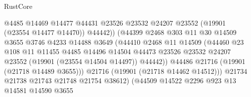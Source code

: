 \begin{lexlean}{RustCore}
\begin{coremodule}
                                      @4485
                                      @14469
                                      @14477
                                      @44431
                                      @23526
                                      @23532
                                      @24207
                                      @23552
                                      (@19901 (@23554 @14477 @14470))
                                      @44442))
                                  (@44399
                                    @2468
                                    @303
                                    @11
                                    @30
                                    @14509
                                    @3655
                                    @3746
                                    @4233
                                    @14488
                                    @3649
                                    (@44410
                                      @2468
                                      @11
                                      @14509
                                      (@44460
                                        @23
                                        @108
                                        @11
                                        @11455
                                        @4485
                                        @14496
                                        @14504
                                        @44473
                                        @23526
                                        @23532
                                        @24207
                                        @23552
                                        (@19901 (@23554 @14504 @14497))
                                        @44442))
                                    @44486
                                    @21716
                                    (@19901 (@21718 @14489 @3655)))
                                  @21716
                                  (@19901 (@21718 @14462 @14512)))
                                @21734
                                @21738
                                @21743
                                @21748
                                @21754
                                @38612)
                              (@44509
                                @14522
                                @2296
                                @923
                                @13
                                @14581
                                @14590
                                @3655

\end{coremodule}
\end{lexlean}
